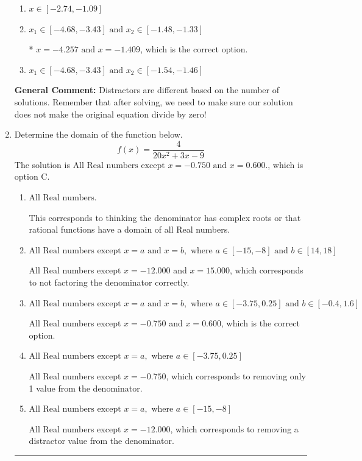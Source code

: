 \documentclass{extbook}[14pt]
\newcommand{\litem}[1]{\item #1

\rule{\textwidth}{0.4pt}}
\begin{document}
\begin{enumerate}
{\begin{enumerate}[label=\Alph*.]
\item \( x \in [-2.74,-1.09] \)


\item \( x_1 \in [-4.68, -3.43] \text{ and } x_2 \in [-1.48,-1.33] \)

* $x = -4.257 \text{ and } x = -1.409$, which is the correct option.
\item \( x_1 \in [-4.68, -3.43] \text{ and } x_2 \in [-1.54,-1.46] \)


\end{enumerate}

\textbf{General Comment:} Distractors are different based on the number of solutions. Remember that after solving, we need to make sure our solution does not make the original equation divide by zero!
}
\litem{
Determine the domain of the function below.
\[ f(x) = \frac{4}{20x^{2} +3 x -9} \]The solution is \( \text{All Real numbers except } x = -0.750 \text{ and } x = 0.600. \), which is option C.\begin{enumerate}[label=\Alph*.]
\item \( \text{All Real numbers.} \)

This corresponds to thinking the denominator has complex roots or that rational functions have a domain of all Real numbers.
\item \( \text{All Real numbers except } x = a \text{ and } x = b, \text{ where } a \in [-15, -8] \text{ and } b \in [14, 18] \)

All Real numbers except $x = -12.000$ and $x = 15.000$, which corresponds to not factoring the denominator correctly.
\item \( \text{All Real numbers except } x = a \text{ and } x = b, \text{ where } a \in [-3.75, 0.25] \text{ and } b \in [-0.4, 1.6] \)

All Real numbers except $x = -0.750$ and $x = 0.600$, which is the correct option.
\item \( \text{All Real numbers except } x = a, \text{ where } a \in [-3.75, 0.25] \)

All Real numbers except $x = -0.750$, which corresponds to removing only 1 value from the denominator.
\item \( \text{All Real numbers except } x = a, \text{ where } a \in [-15, -8] \)

All Real numbers except $x = -12.000$, which corresponds to removing a distractor value from the denominator.
\end{enumerate}

}
\end{enumerate}
\end{document}

